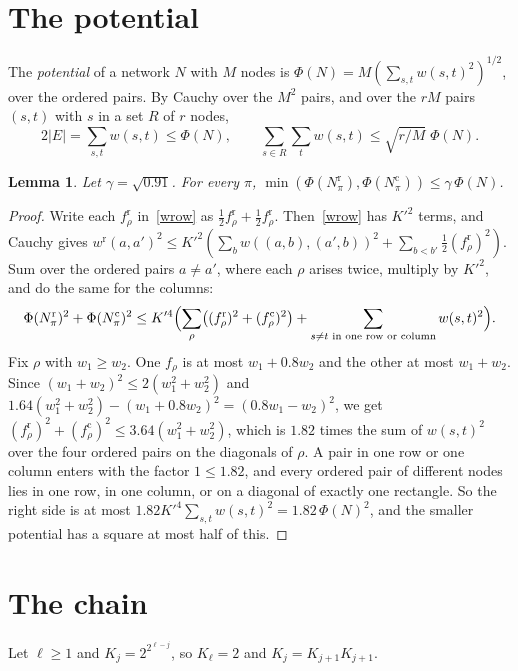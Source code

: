 \documentclass[10pt]{article}
\newtheorem{lemma}[theorem]{Lemma}
\begin{document}
\section{The potential}

The \emph{potential} of a network $N$ with $M$ nodes is $\Phi(N)=M(\sum_{s,t}w(s,t)^2)^{1/2}$, over the ordered pairs. By Cauchy over the $M^2$ pairs, and over the $rM$ pairs $(s,t)$ with $s$ in a set $R$ of $r$ nodes,
\begin{equation}\label{ends}
2|E|=\sum_{s,t}w(s,t)\le\Phi(N),\qquad\sum_{s\in R}\sum_tw(s,t)\le\sqrt{r/M}\;\Phi(N).
\end{equation}

\begin{lemma}\label{lem:phi}
Let $\gamma=\sqrt{0.91}$. For every $\pi$, $\min(\Phi(N^{\mathrm r}_\pi),\Phi(N^{\mathrm c}_\pi))\le\gamma\,\Phi(N)$.
\end{lemma}
\begin{proof}
Write each $f^{\mathrm r}_\rho$ in~\eqref{wrow} as $\frac12f^{\mathrm r}_\rho+\frac12f^{\mathrm r}_\rho$. Then~\eqref{wrow} has $K'^2$ terms, and Cauchy gives $w^{\mathrm r}(a,a')^2\le K'^2(\sum_bw((a,b),(a',b))^2+\sum_{b<b'}\frac12(f^{\mathrm r}_\rho)^2)$. Sum over the ordered pairs $a\ne a'$, where each $\rho$ arises twice, multiply by $K'^2$, and do the same for the columns:
\[
\Phi(N^{\mathrm r}_\pi)^2+\Phi(N^{\mathrm c}_\pi)^2\le K'^4\Bigl(\sum_\rho\bigl((f^{\mathrm r}_\rho)^2+(f^{\mathrm c}_\rho)^2\bigr)+\sum_{s\ne t\text{ in one row or column}}w(s,t)^2\Bigr).
\]
Fix $\rho$ with $w_1\ge w_2$. One $f_\rho$ is at most $w_1+0.8w_2$ and the other at most $w_1+w_2$. Since $(w_1+w_2)^2\le2(w_1^2+w_2^2)$ and $1.64(w_1^2+w_2^2)-(w_1+0.8w_2)^2=(0.8w_1-w_2)^2$, we get $(f^{\mathrm r}_\rho)^2+(f^{\mathrm c}_\rho)^2\le3.64(w_1^2+w_2^2)$, which is $1.82$ times the sum of $w(s,t)^2$ over the four ordered pairs on the diagonals of $\rho$. A pair in one row or one column enters with the factor $1\le1.82$, and every ordered pair of different nodes lies in one row, in one column, or on a diagonal of exactly one rectangle. So the right side is at most $1.82K'^4\sum_{s,t}w(s,t)^2=1.82\,\Phi(N)^2$, and the smaller potential has a square at most half of this.
\end{proof}

\section{The chain}

Let $\ell\ge1$ and $K_j=2^{2^{\ell-j}}$, so $K_\ell=2$ and $K_j=K_{j+1}K_{j+1}$.
\end{document}
